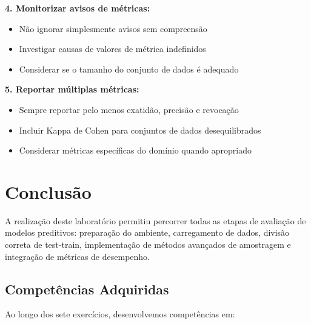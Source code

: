 \documentclass[12pt,a4paper]{article}
\begin{document}
\textbf{4. Monitorizar avisos de métricas:}
\begin{itemize}
    \item Não ignorar simplesmente avisos sem compreensão
    \item Investigar causas de valores de métrica indefinidos
    \item Considerar se o tamanho do conjunto de dados é adequado
\end{itemize}

\textbf{5. Reportar múltiplas métricas:}
\begin{itemize}
    \item Sempre reportar pelo menos exatidão, precisão e revocação
    \item Incluir Kappa de Cohen para conjuntos de dados desequilibrados
    \item Considerar métricas específicas do domínio quando apropriado
\end{itemize}

\section{Conclusão}

A realização deste laboratório permitiu percorrer todas as etapas de avaliação de modelos preditivos: preparação do ambiente, carregamento de dados, divisão correta de test-train, implementação de métodos avançados de amostragem e integração de métricas de desempenho.

\subsection{Competências Adquiridas}

Ao longo dos sete exercícios, desenvolvemos competências em:
\end{document}
